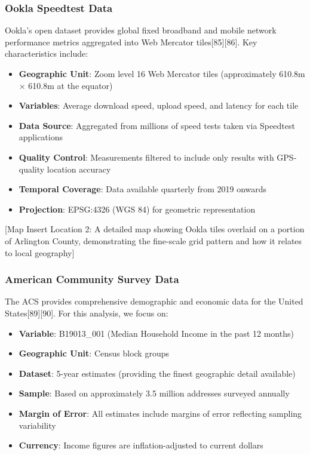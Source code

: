 \documentclass[
  letterpaper,
  DIV=11,
  numbers=noendperiod]{scrartcl}
\providecommand{\tightlist}{%
  \setlength{\itemsep}{0pt}\setlength{\parskip}{0pt}}
\begin{document}
\subsubsection{Ookla Speedtest Data}\label{ookla-speedtest-data}

Ookla's open dataset provides global fixed broadband and mobile network
performance metrics aggregated into Web Mercator tiles{[}85{]}{[}86{]}.
Key characteristics include:

\begin{itemize}
\tightlist
\item
  \textbf{Geographic Unit}: Zoom level 16 Web Mercator tiles
  (approximately 610.8m × 610.8m at the equator)
\item
  \textbf{Variables}: Average download speed, upload speed, and latency
  for each tile
\item
  \textbf{Data Source}: Aggregated from millions of speed tests taken
  via Speedtest applications
\item
  \textbf{Quality Control}: Measurements filtered to include only
  results with GPS-quality location accuracy
\item
  \textbf{Temporal Coverage}: Data available quarterly from 2019 onwards
\item
  \textbf{Projection}: EPSG:4326 (WGS 84) for geometric representation
\end{itemize}

{[}Map Insert Location 2: A detailed map showing Ookla tiles overlaid on
a portion of Arlington County, demonstrating the fine-scale grid pattern
and how it relates to local geography{]}

\subsubsection{American Community Survey
Data}\label{american-community-survey-data}

The ACS provides comprehensive demographic and economic data for the
United States{[}89{]}{[}90{]}. For this analysis, we focus on:

\begin{itemize}
\tightlist
\item
  \textbf{Variable}: B19013\_001 (Median Household Income in the past 12
  months)
\item
  \textbf{Geographic Unit}: Census block groups
\item
  \textbf{Dataset}: 5-year estimates (providing the finest geographic
  detail available)
\item
  \textbf{Sample}: Based on approximately 3.5 million addresses surveyed
  annually
\item
  \textbf{Margin of Error}: All estimates include margins of error
  reflecting sampling variability
\item
  \textbf{Currency}: Income figures are inflation-adjusted to current
  dollars
\end{itemize}
\end{document}
